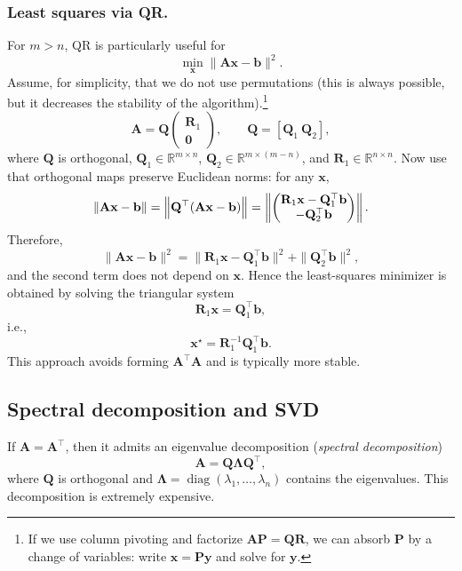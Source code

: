 \subsubsection{Least squares via QR.}
For $m>n$, QR is particularly useful for
\[
  \min_{\mathbf{x}}\|\mathbf{A}\mathbf{x}-\mathbf{b}\|^2.
\]
Assume, for simplicity, that we do not use permutations (this is always
possible, but it decreases the stability of the algorithm).\footnote{If we use
column pivoting and factorize $\mathbf{A}\mathbf{P}=\mathbf{Q}\mathbf{R}$, we
can absorb $\mathbf{P}$ by a change of variables: write $\mathbf{x}=\mathbf{P}\mathbf{y}$
and solve for $\mathbf{y}$.}
\[
  \mathbf{A}=\mathbf{Q}
  \begin{pmatrix}
    \mathbf{R}_1\\
    \mathbf{0}
  \end{pmatrix},
  \qquad
  \mathbf{Q}=[\mathbf{Q}_1\ \mathbf{Q}_2],
\]
where $\mathbf{Q}$ is orthogonal, $\mathbf{Q}_1\in\mathbb{R}^{m\times n}$,
$\mathbf{Q}_2\in\mathbb{R}^{m\times (m-n)}$, and
$\mathbf{R}_1\in\mathbb{R}^{n\times n}$.
Now use that orthogonal maps preserve Euclidean norms: for any $\mathbf{x}$,
\[
  \|\mathbf{A}\mathbf{x}-\mathbf{b}\|
  =
  \Bigl\|\mathbf{Q}^\top(\mathbf{A}\mathbf{x}-\mathbf{b})\Bigr\|
  =
  \left\|
    \begin{pmatrix}
      \mathbf{R}_1\mathbf{x}-\mathbf{Q}_1^\top\mathbf{b}\\
      -\mathbf{Q}_2^\top\mathbf{b}
    \end{pmatrix}
  \right\|.
\]
Therefore,
\[
  \|\mathbf{A}\mathbf{x}-\mathbf{b}\|^2
  =
  \|\mathbf{R}_1\mathbf{x}-\mathbf{Q}_1^\top\mathbf{b}\|^2
  +
  \|\mathbf{Q}_2^\top\mathbf{b}\|^2,
\]
and the second term does not depend on $\mathbf{x}$. Hence the least-squares
minimizer is obtained by solving the triangular system
\[
  \mathbf{R}_1\mathbf{x}=\mathbf{Q}_1^\top\mathbf{b},
\]
i.e.,
\[
  \mathbf{x}^\star = \mathbf{R}_1^{-1}\mathbf{Q}_1^\top \mathbf{b}.
\]
This approach avoids forming $\mathbf{A}^\top\mathbf{A}$ and is typically more
stable.

\subsection{Spectral decomposition and SVD}
If $\mathbf{A}=\mathbf{A}^\top$, then it admits an eigenvalue decomposition
(\emph{spectral decomposition})
\[
  \mathbf{A}=\mathbf{Q}\boldsymbol{\Lambda}\mathbf{Q}^\top,
\]
where $\mathbf{Q}$ is orthogonal and
$\boldsymbol{\Lambda}=\operatorname{diag}(\lambda_1,\dots,\lambda_n)$ contains
the eigenvalues. This decomposition is extremely expensive.

